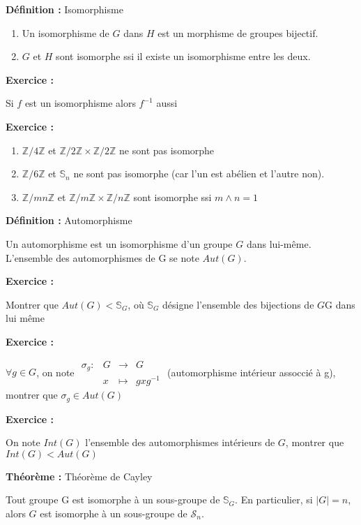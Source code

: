 \documentclass{report}
\newenvironment{definition}[1][]{
    \begin{tcolorbox}[colframe= white]
    \textbf{Définition :} 
    #1 \par
    }
    {\end{tcolorbox}}
\newenvironment{exo}{\begin{tcolorbox}[colframe= white]
    \textbf{Exercice :}
    \par}
    {\end{tcolorbox}}
\newenvironment{theoreme}[1][]{
    \begin{tcolorbox}[]
    \textbf{Théorème :} #1  \par} 
    {\end{tcolorbox}}
\newcommand{\fonction}[5]{
    \begin{array}{l|rcl}
    #1: & #2 & \longrightarrow & #3 \\
        & #4 & \longmapsto & #5 
    \end{array}
}
\newcommand{\Z}{\mathbb{Z}}
\newcommand{\znz}{\Z/n\Z}
\newcommand{\sn}{\mathcal{S}_{n}}
\begin{document}
\begin{definition}[Isomorphisme]
\begin{enumerate}
    \item Un isomorphisme de $G$ dans $H$ est un morphisme de groupes bijectif.
    \item $G$ et $H$ sont isomorphe ssi il existe un isomorphisme entre les deux.
\end{enumerate}
\end{definition}

\begin{exo}
    Si $f$ est un isomorphisme alors $f^{-1}$ aussi
\end{exo}

\begin{exo}
\begin{enumerate}
    \item $\Z /4\Z$ et $\Z/2\Z \times \Z/2\Z$ ne sont pas isomorphe
    \item $\Z/6\Z$ et $\mathbb{S}_n$ ne sont pas isomorphe (car l'un est abélien et l'autre non).
    \item $\Z/mn\Z$ et $\Z/m\Z \times \znz$ sont isomorphe ssi $m\wedge n = 1$
\end{enumerate}
\end{exo}

\begin{definition}[Automorphisme]
    Un automorphisme est un isomorphisme d'un groupe $G$ dans lui-même. L'ensemble des automorphismes de G se note $Aut(G)$.
\end{definition}

\begin{exo}
    Montrer que $Aut(G) < \mathbb{S}_G$, où $\mathbb{S}_{G}$ désigne l'ensemble des bijections de $G$G dans lui même
\end{exo}

\begin{exo}
    $\forall g\in G$, on note $\fonction{\sigma_g}{G}{G}{x}{gxg^{-1}}$ (automorphisme intérieur assoccié à g), montrer que $\sigma_g \in Aut(G)$
\end{exo}

\begin{exo}
    On note $Int(G)$ l'ensemble des automorphismes intérieurs de $G$, montrer que $Int(G) < Aut(G)$
\end{exo}

\begin{theoreme}[Théorème de Cayley]
    Tout groupe G est isomorphe à un sous-groupe de $\mathbb{S}_G$. En particulier, si $|G| = n$, alors $G$ est isomorphe à un sous-groupe de $\sn$.
\end{theoreme}
\end{document}
